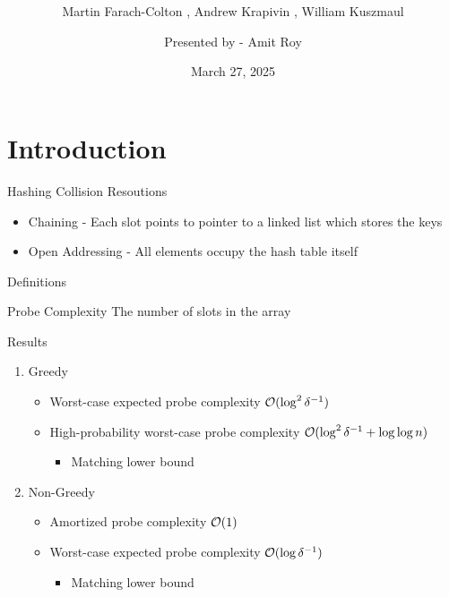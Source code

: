 \documentclass{beamer}
\title{ \sc \color{blue}{Optimal Bounds for Open Addressing Without Reordering}}
\subtitle{Martin Farach-Colton , Andrew Krapivin , William Kuszmaul}
\author{Presented by - Amit Roy }
\institute{}
\date{March 27, 2025}
\begin{document}
 
\begin{frame}
\titlepage
\end{frame} 



\section{Introduction}

\begin{frame}{Hashing}
	Collision Resoutions
	\begin{itemize}
		\item Chaining - Each slot points to pointer to a linked list which stores the keys
		\item Open Addressing - All elements occupy the hash table itself
	\end{itemize}
\end{frame}

\begin{frame}{Definitions} 
	\begin{block}{Probe Complexity}
		The number of slots in the array 
	\end{block}
\end{frame}

\begin{frame}{Results}
	
	\begin{enumerate}
		\item Greedy
		\begin{itemize}
			\item Worst-case expected probe complexity ${\cal O}(\log^2{\delta^{-1}})$
			\item High-probability worst-case probe complexity ${\cal O}(\log^2{\delta^{-1}} + \log{\log{n}})$
			\begin{itemize}
				\item Matching lower bound
			\end{itemize}
		\end{itemize}
	\vspace{10mm}
	\item Non-Greedy 
	\begin{itemize}
		\item Amortized probe complexity ${\cal O}(1)$
		\item Worst-case expected probe complexity ${\cal O}(\log{\delta^{-1}})$
		\begin{itemize}
			\item Matching lower bound
		\end{itemize}
	\end{itemize}
	\end{enumerate}
\end{frame}
\end{document}
